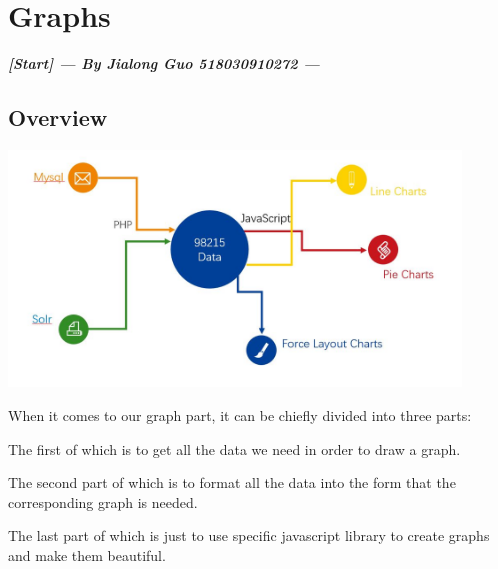 \documentclass[10pt,twoside,a4paper,titlepage]{article}
\begin{document}
	
	
	




\newpage

	\section{Graphs}
		\textbf{\emph{[Start] --- By Jialong Guo 518030910272 ---}}\newline\par

	\subsection{Overview}
		\includegraphics[width=0.9\textwidth]{gjl/overview.jpg}\newline\par
		When it comes to our graph part, it can be chiefly divided into three parts: \newline \par
		The first of which is to get all the data we need in order to draw a graph.\newline\par
		The second part of which is to format all the data into the form that the corresponding graph is needed.\newline\par
		The last part of which is just to use specific javascript library to create graphs and make them beautiful. \newline\par
\end{document}

